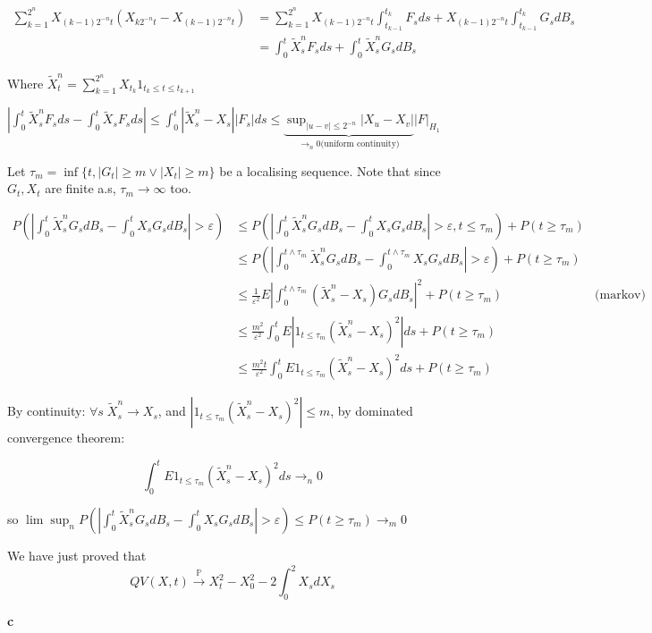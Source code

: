 \documentclass[11pt]{article}
\begin{document}
\begin{align*}
\sum_{k=1}^{2^n} X_{(k-1)2^{-n}t}(X_{k2^{-n}t} -  X_{(k-1)2^{-n}t})
&= \sum_{k=1}^{2^n} X_{(k-1)2^{-n}t} \int_{t_{k-1}}^{t_k} F_s ds + X_{(k-1)2^{-n}t} \int_{t_{k-1}}^{t_k} G_s dB_s
\\&=  \int_0^t \tilde X^n_s F_s ds + \int_0^t  \tilde X^n_s G_s dB_s
\end{align*}

Where \(\tilde X^n_t = \sum_{k=1}^{2^n} X_{t_k} 1_{t_k \le t \le t_{k+1}}\)

\(|\int_0^t \tilde X^n_s F_s ds - \int_0^t \tilde X_s F_s ds| \le \int_0^t |\tilde X^n_s - X_s| |F_s| ds \le \underbrace{\sup_{|u-v| \le 2^{-n}} |X_u - X_v|}_{\rightarrow_n 0 \text{(uniform continuity)}} |F|_{H_1}\)

Let \(\tau_m = \inf\{t , |G_t| \ge m \vee |X_t| \ge m\}\) be a localising sequence. Note that since \(G_t, X_t\) are finite a.s, \(\tau_m \rightarrow \infty\) too.

\begin{align*}
P(|\int_0^t \tilde X_s^nG_sdB_s -  \int_0^t X_sG_sdB_s| > \varepsilon)
&\le P(|\int_0^t \tilde X_s^nG_sdB_s -  \int_0^t X_sG_sdB_s| > \varepsilon, t \le \tau_m) + P(t \ge \tau_m)
\\&\le P(|\int_0^{t \wedge \tau_m} \tilde X_s^nG_sdB_s -  \int_0^{t \wedge \tau_m} X_sG_sdB_s| > \varepsilon) + P(t \ge \tau_m)
\\&\le \frac1{\varepsilon^2}E|\int_0^{t \wedge \tau_m} (\tilde X_s^n - X_s)G_sdB_s |^2 + P(t \ge \tau_m)
&\text{(markov)}
\\&\le \frac{m^2}{\varepsilon^2}\int_0^t E| 1_{t \le \tau_m} (\tilde X_s^n - X_s)^2 |ds + P(t \ge \tau_m)
\\&\le \frac{m^2t}{\varepsilon^2}\int_0^t E 1_{t \le \tau_m} (\tilde X_s^n - X_s)^2 ds + P(t \ge \tau_m)
\end{align*}

By continuity: \(\forall s \; \tilde X_s^n  \rightarrow X_s\), and \(|1_{t \le \tau_m} (\tilde X_s^n - X_s)^2| \le m\), by dominated convergence theorem:

$$\int_0^t E 1_{t \le \tau_m} (\tilde X_s^n - X_s)^2 ds  \rightarrow_n 0$$

so \(\lim\sup_n P(|\int_0^t \tilde X_s^nG_sdB_s -  \int_0^t X_sG_sdB_s| > \varepsilon) \le P(t \ge \tau_m) \rightarrow_m 0\)

We have just proved that
$$QV(X, t) \overset{\mathbb P}{\rightarrow} X_t^2 - X_0^2 - 2\int_0^2 X_s dX_s$$

\textbf{c}
\end{document}
